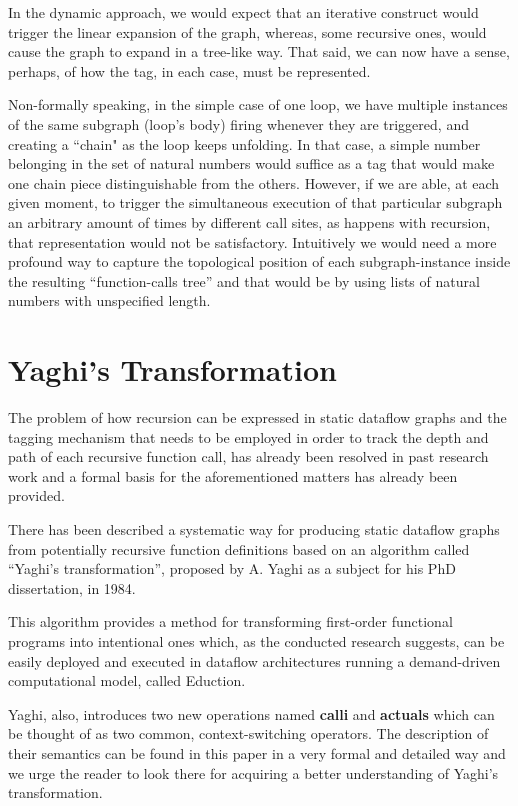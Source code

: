 \documentclass[ack,preface]{dithesis}
\begin{document}
In the dynamic approach, we would expect that an iterative construct would trigger the linear expansion of the graph, whereas, some recursive ones, would cause the graph to expand in a tree-like way. That said, we can now have a sense, perhaps, of how the tag, in each case, must be represented. 

Non-formally speaking, in the simple case of one  loop, we have multiple instances of the same subgraph (loop’s body) firing whenever they are triggered, and creating a ``chain" as the loop keeps unfolding. In that case, a simple number belonging in the set of natural numbers would suffice as a tag that would make one chain piece distinguishable from the others. However, if we are able, at each given moment, to trigger the simultaneous execution of that particular subgraph an arbitrary amount of times by different call sites, as happens with recursion, that representation would not be satisfactory. Intuitively we would need a more profound way to capture the topological position of each subgraph-instance inside the resulting “function-calls tree” and that would be by using lists of natural numbers with unspecified length.

    \section{Yaghi's Transformation}
The problem of how recursion can be expressed in static dataflow graphs and the tagging mechanism that needs to be employed in order to track the depth and path of each recursive function call, has already been resolved in past research work and a formal basis for the aforementioned matters has already been provided.  \cite{Rondogiannis:1997}

There has been described a systematic way for producing static dataflow graphs from potentially recursive function definitions based on an algorithm called “Yaghi’s transformation”, proposed by A. Yaghi as a subject for his PhD dissertation, in 1984.

This algorithm provides a method for transforming first-order functional programs into intentional ones which, as the conducted research suggests, can be easily deployed and executed in dataflow architectures running a demand-driven computational model, called Eduction.

Yaghi, also, introduces two new operations named \textbf{calli} and \textbf{actuals} which can be  thought of as two common, context-switching operators. 
The description of their semantics can be found in this paper \cite{Rondogiannis:1997} in a very formal and detailed way and we urge the reader to look there for acquiring a better understanding of Yaghi's transformation.\\
\end{document}
